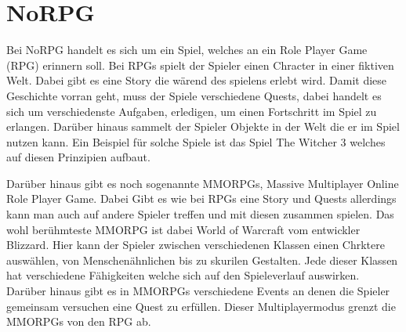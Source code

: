 \chapter{NoRPG}


		
		
Bei NoRPG handelt es sich um ein Spiel, welches an ein Role Player Game (RPG) erinnern soll. Bei RPGs spielt der Spieler einen Chracter in einer fiktiven Welt. Dabei gibt es eine Story die wärend des spielens erlebt wird. Damit diese Geschichte vorran geht, muss der Spiele verschiedene Quests, dabei handelt es sich um verschiedenste Aufgaben, erledigen, um einen Fortschritt im Spiel zu erlangen. Darüber hinaus sammelt der Spieler Objekte in der Welt die er im Spiel nutzen kann. Ein Beispiel für solche Spiele ist das Spiel The Witcher 3 welches auf diesen Prinzipien aufbaut. 
	
Darüber hinaus gibt es noch sogenannte MMORPGs, Massive Multiplayer Online Role Player Game. Dabei Gibt es wie bei RPGs eine Story und Quests allerdings kann man auch auf andere Spieler treffen und mit diesen zusammen spielen. Das wohl berühmteste MMORPG ist dabei World of Warcraft vom entwickler Blizzard. Hier kann der Spieler zwischen verschiedenen Klassen einen Chrktere auswählen, von Menschenähnlichen bis zu skurilen Gestalten. Jede dieser Klassen hat verschiedene Fähigkeiten welche sich auf den Spieleverlauf auswirken. Darüber hinaus gibt es in MMORPGs verschiedene Events an denen die Spieler gemeinsam versuchen eine Quest zu erfüllen. Dieser Multiplayermodus grenzt die MMORPGs von den RPG ab.

